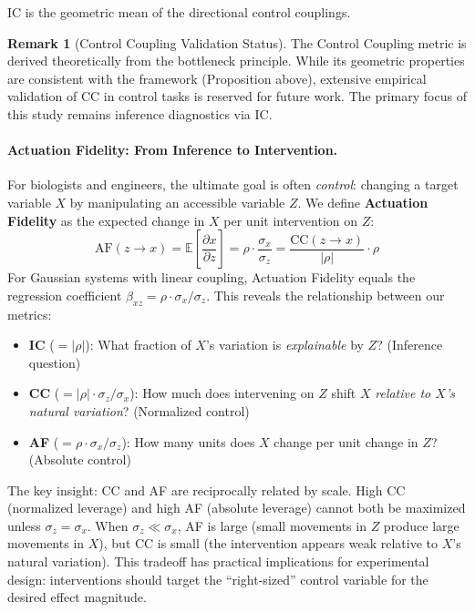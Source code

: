 \documentclass[10pt]{article} %
\theoremstyle{plain}
\theoremstyle{definition}
\newtheorem{remark}[theorem]{Remark}
\newcommand{\CC}{\mathrm{CC}}  %
\begin{document}
IC is the geometric mean of the directional control couplings.

\begin{remark}[Control Coupling Validation Status]
The Control Coupling metric is derived theoretically from the bottleneck principle. While its geometric properties are consistent with the framework (Proposition above), extensive empirical validation of CC in control tasks is reserved for future work. The primary focus of this study remains inference diagnostics via IC.
\end{remark}

\paragraph{Actuation Fidelity: From Inference to Intervention.} For biologists and engineers, the ultimate goal is often \emph{control}: changing a target variable $X$ by manipulating an accessible variable $Z$. We define \textbf{Actuation Fidelity} as the expected change in $X$ per unit intervention on $Z$:
\begin{equation}
\text{AF}(z \to x) = \mathbb{E}\left[\frac{\partial x}{\partial z}\right] = \rho \cdot \frac{\sigma_x}{\sigma_z} = \frac{\CC(z \to x)}{|\rho|} \cdot \rho
\end{equation}
For Gaussian systems with linear coupling, Actuation Fidelity equals the regression coefficient $\beta_{xz} = \rho \cdot \sigma_x / \sigma_z$. This reveals the relationship between our metrics:
\begin{itemize}
    \item \textbf{IC} ($= |\rho|$): What fraction of $X$'s variation is \emph{explainable} by $Z$? (Inference question)
    \item \textbf{CC} ($= |\rho| \cdot \sigma_z/\sigma_x$): How much does intervening on $Z$ shift $X$ \emph{relative to $X$'s natural variation}? (Normalized control)
    \item \textbf{AF} ($= \rho \cdot \sigma_x/\sigma_z$): How many units does $X$ change per unit change in $Z$? (Absolute control)
\end{itemize}

The key insight: CC and AF are reciprocally related by scale. High CC (normalized leverage) and high AF (absolute leverage) cannot both be maximized unless $\sigma_z = \sigma_x$. When $\sigma_z \ll \sigma_x$, AF is large (small movements in $Z$ produce large movements in $X$), but CC is small (the intervention appears weak relative to $X$'s natural variation). This tradeoff has practical implications for experimental design: interventions should target the ``right-sized'' control variable for the desired effect magnitude.
\end{document}
